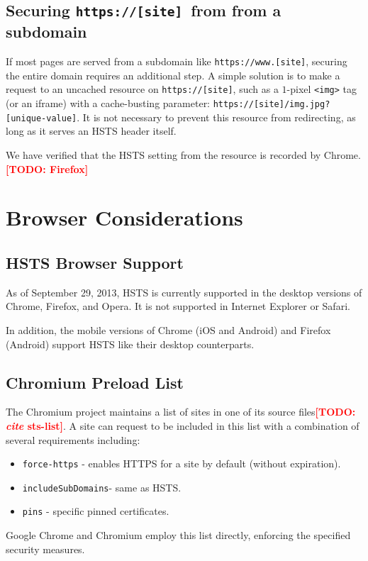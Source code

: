 \documentclass[conference]{./IEEEtran}
\newcommand{\todo}[1]{\textcolor{red}{\textbf{[TODO: #1]}}}
\newcommand{\td}[2]{\textcolor{red}{\textbf{[TODO: {\it{#1}} #2]}}}
\newcommand{\site}[1]{\texttt{#1}}
\newcommand{\code}[1]{\texttt{#1}}
\newcommand{\iSD}{{\code{includeSubDomains}}}
\newcommand{\genericsite}{[site]}
\newcommand{\s}{{\site{https://\genericsite}}}
\newcommand{\sw}{{\site{https://www.\genericsite}}}
\theoremstyle{plain}
\begin{document}
\subsection{Securing \s~from from a subdomain}

If most pages are served from a subdomain like \sw, securing the entire domain requires an additional step. A simple solution is to make a request to an uncached resource on \s, such as a $1$-pixel \code{<img>} tag (or an iframe) with a cache-busting parameter: \site{\s/img.jpg?[unique-value]}. It is not necessary to prevent this resource from redirecting, as long as it serves an HSTS header itself.

We have verified that the HSTS setting from the resource is recorded by Chrome. \todo{Firefox}

\section{Browser Considerations}

\subsection{HSTS Browser Support}

As of September 29, 2013, HSTS is currently supported in the desktop versions of Chrome, Firefox, and Opera. It is not supported in Internet Explorer or Safari.\cite{support}

In addition, the mobile versions of Chrome (iOS and Android) and Firefox (Android) support HSTS like their desktop counterparts\cite{mdn}.

\subsection{Chromium Preload List}

The Chromium project maintains a list of sites in one of its source files\td{cite}{sts-list}. A site can request to be included in this list with a combination of several requirements including:

\begin{itemize}
\item \code{force-https} - enables HTTPS for a site by default (without expiration).
\item \iSD - same as HSTS.
\item \code{pins} - specific pinned certificates.
\end{itemize}

Google Chrome and Chromium employ this list directly, enforcing the specified security measures.
\end{document}
